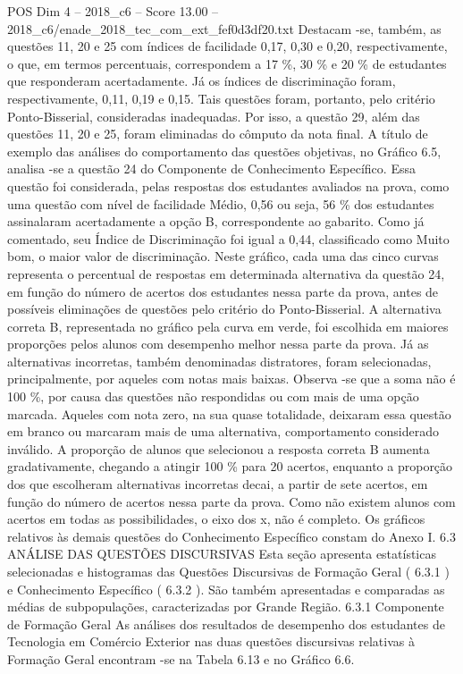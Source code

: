 \begin{textsample}{POS Dim 4 – 2018\_c6 – Score 13.00 – 2018\_c6/enade\_2018\_tec\_com\_ext\_fef0d3df20.txt}
Destacam -se, também, as questões 11, 20 e 25 com índices de facilidade 0,17, 0,30 e 0,20, respectivamente, o que, em termos percentuais, correspondem a 17 \%, 30 \% e 20 \% de estudantes que responderam acertadamente.
Já os índices de discriminação foram, respectivamente, 0,11, 0,19 e 0,15.
Tais questões foram, portanto, pelo critério Ponto-Bisserial, consideradas inadequadas.
Por isso, a questão 29, além das questões 11, 20 e 25, foram eliminadas do cômputo da nota final.
A título de exemplo das análises do comportamento das questões objetivas, no Gráfico 6.5, analisa -se a questão 24 do Componente de Conhecimento Específico.
Essa questão foi considerada, pelas respostas dos estudantes avaliados na prova, como uma questão com nível de facilidade Médio, 0,56 ou seja, 56 \% dos estudantes assinalaram acertadamente a opção B, correspondente ao gabarito.
Como já comentado, seu Índice de Discriminação foi igual a 0,44, classificado como Muito bom, o maior valor de discriminação.
Neste gráfico, cada uma das cinco curvas representa o percentual de respostas em determinada alternativa da questão 24, em função do número de acertos dos estudantes nessa parte da prova, antes de possíveis eliminações de questões pelo critério do Ponto-Bisserial.
A alternativa correta B, representada no gráfico pela curva em verde, foi escolhida em maiores proporções pelos alunos com desempenho melhor nessa parte da prova.
Já as alternativas incorretas, também denominadas distratores, foram selecionadas, principalmente, por aqueles com notas mais baixas.
Observa -se que a soma não é 100 \%, por causa das questões não respondidas ou com mais de uma opção marcada.
Aqueles com nota zero, na sua quase totalidade, deixaram essa questão em branco ou marcaram mais de uma alternativa, comportamento considerado inválido.
A proporção de alunos que selecionou a resposta correta B aumenta gradativamente, chegando a atingir 100 \% para 20 acertos, enquanto a proporção dos que escolheram alternativas incorretas decai, a partir de sete acertos, em função do número de acertos nessa parte da prova.
Como não existem alunos com acertos em todas as possibilidades, o eixo dos x, não é completo.
Os gráficos relativos às demais questões do Conhecimento Específico constam do Anexo I. 6.3 ANÁLISE DAS QUESTÕES DISCURSIVAS Esta seção apresenta estatísticas selecionadas e histogramas das Questões Discursivas de Formação Geral ( 6.3.1 ) e Conhecimento Específico ( 6.3.2 ).
São também apresentadas e comparadas as médias de subpopulações, caracterizadas por Grande Região. 6.3.1 Componente de Formação Geral As análises dos resultados de desempenho dos estudantes de Tecnologia em Comércio Exterior nas duas questões discursivas relativas à Formação Geral encontram -se na Tabela 6.13 e no Gráfico 6.6.

\end{textsample}
